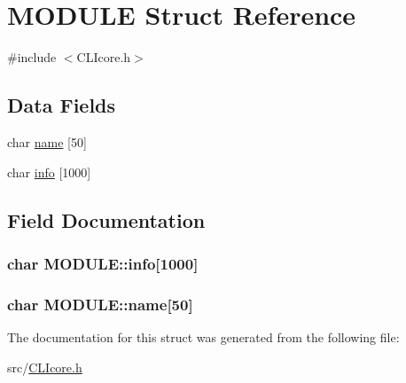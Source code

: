\hypertarget{structMODULE}{\section{M\+O\+D\+U\+L\+E Struct Reference}
\label{structMODULE}
}


{\ttfamily \#include $<$C\+L\+Icore.\+h$>$}

\subsection*{Data Fields}
\begin{DoxyCompactItemize}
\item 
char \hyperlink{structMODULE_adecbd02b92ae79ddaaff7be512380dea}{name} \mbox{[}50\mbox{]}
\item 
char \hyperlink{structMODULE_a8e21f2da9fe77d9781fc77e712d9e40c}{info} \mbox{[}1000\mbox{]}
\end{DoxyCompactItemize}


\subsection{Field Documentation}
\hypertarget{structMODULE_a8e21f2da9fe77d9781fc77e712d9e40c}{
\subsubsection[{info}]{\setlength{\rightskip}{0pt plus 5cm}char M\+O\+D\+U\+L\+E\+::info\mbox{[}1000\mbox{]}}}\label{structMODULE_a8e21f2da9fe77d9781fc77e712d9e40c}
\hypertarget{structMODULE_adecbd02b92ae79ddaaff7be512380dea}{
\subsubsection[{name}]{\setlength{\rightskip}{0pt plus 5cm}char M\+O\+D\+U\+L\+E\+::name\mbox{[}50\mbox{]}}}\label{structMODULE_adecbd02b92ae79ddaaff7be512380dea}


The documentation for this struct was generated from the following file\+:\begin{DoxyCompactItemize}
\item 
src/\hyperlink{CLIcore_8h}{C\+L\+Icore.\+h}\end{DoxyCompactItemize}
